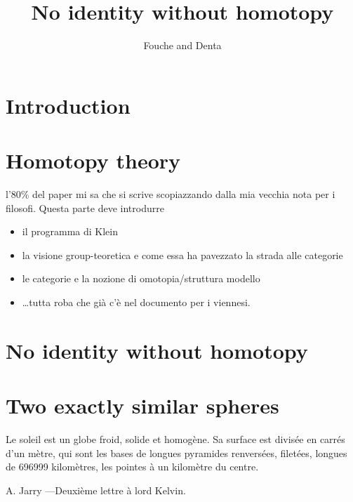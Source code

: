 \documentclass{amsart}
\author{Fouche and Denta}
\title{No identity without homotopy}
\begin{document}
\section{Introduction}
\section{Homotopy theory}
l'80\% del paper mi sa che si scrive scopiazzando dalla mia vecchia nota per i filosofi. Questa parte deve introdurre
\begin{itemize}
  \item il programma di Klein 
  \item la visione group-teoretica e come essa ha pavezzato la strada alle categorie
  \item le categorie e la nozione di omotopia/struttura modello
  \item \dots tutta roba che già c'è nel documento per i viennesi.
\end{itemize}
\section{No identity without homotopy}
\section{Two exactly similar spheres}
\epigraph{Le soleil est un globe froid, solide et homogène. Sa surface est divisée en carrés d’un mètre, qui sont les bases de longues pyramides renversées, filetées, longues de 696999 kilomètres, les pointes à un kilomètre du centre. }{A. Jarry ---Deuxième lettre à lord Kelvin.}
\end{document}
